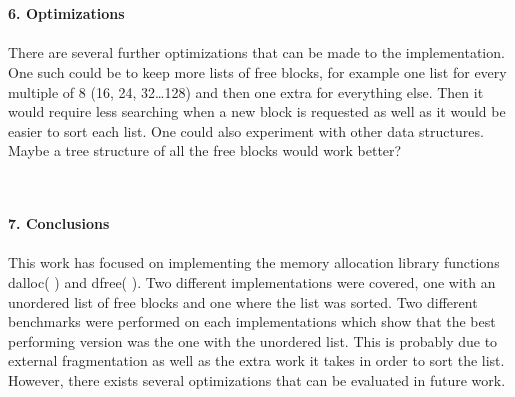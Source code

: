 \documentclass[a4paper,10pt]{article}
\begin{document}
\maketitle
\textbf
{\\\\6. Optimizations\\\\}
There are several further optimizations that can be made to the implementation. One such could be to keep more lists of free blocks, for example one list for every multiple of 8 (16, 24, 32…128) and then one extra for everything else. Then it would require less searching when a new block is requested as well as it would be easier to sort each list. One could also experiment with other data structures. Maybe a tree structure of all the free blocks would work better?  

\maketitle
\textbf
{\\\\7. Conclusions\\\\}
This work has focused on implementing the memory allocation library functions dalloc( ) and dfree( ). Two different implementations were covered, one with an unordered list of free blocks and one where the list was sorted. Two different benchmarks were performed on each implementations which show that the best performing version was the one with the unordered list. This is probably due to external fragmentation as well as the extra work it takes in order to sort the list. However, there exists several optimizations that can be evaluated in future work. 
\end{document}
